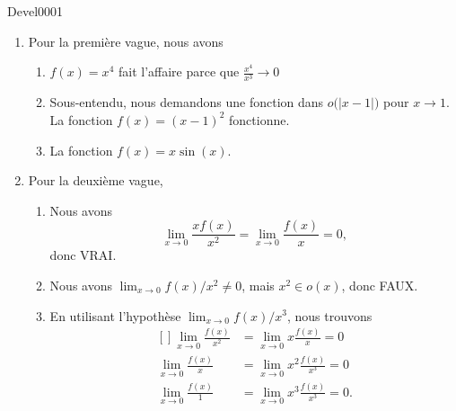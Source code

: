 
\begin{corrige}{Devel0001}

\begin{enumerate}

\item
Pour la première vague, nous avons
\begin{enumerate}

\item
$f(x)=x^4$ fait l'affaire parce que $\frac{ x^4 }{ x^3 }\to 0$

\item
Sous-entendu, nous demandons une fonction dans $o\big( | x-1 | \big)$ pour $x\to 1$. La fonction $f(x)=(x-1)^2$ fonctionne.

\item
La fonction $f(x)=x\sin(x)$.

\end{enumerate}

\item
Pour la deuxième vague,
\begin{enumerate}

\item
Nous avons
\begin{equation}
	\lim_{x\to 0} \frac{ xf(x) }{ x^2 }=\lim_{x\to 0} \frac{ f(x) }{ x }=0, 
\end{equation}
donc VRAI.

\item
Nous avons $\lim_{x\to 0} f(x)/x^2\neq 0$, mais $x^2\in o(x)$, donc FAUX.

\item
En utilisant l'hypothèse $\lim_{x\to 0} f(x)/x^3$, nous trouvons
\begin{equation}
	\begin{aligned}[]
		\lim_{x\to 0} \frac{ f(x) }{ x^2 }&=\lim_{x\to 0} x\frac{ f(x) }{ x }=0\\
		\lim_{x\to 0} \frac{ f(x) }{ x }&=\lim_{x\to 0} x^2\frac{ f(x) }{ x^3 }=0\\
		\lim_{x\to 0} \frac{ f(x) }{ 1 }&=\lim_{x\to 0} x^3\frac{ f(x) }{ x^3 }=0.
\end{aligned}
\end{equation}
\end{enumerate}
\end{enumerate}
\end{corrige}
